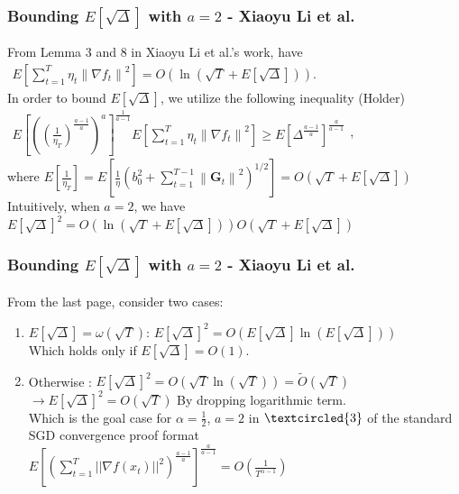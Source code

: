 \documentclass{beamer}
\begin{document}
\begin{frame}
\frametitle{Bounding $E\left[\sqrt{\Delta}\right]$ with $a = 2$ - Xiaoyu Li et al.}
    From Lemma 3 and 8 in Xiaoyu Li et al.'s work, have 
    $\begin{aligned} E\left[\sum_{t=1}^T \eta_t\left\|\nabla f_t\right\|^2\right] = O\left( \ln \left(\sqrt{T}+ E\left[\sqrt{\Delta}\right]\right)\right) .\end{aligned}$
    \\In order to bound $E\left[\sqrt{\Delta}\right]$,  we utilize the following inequality (Holder)
    $\begin{aligned} E\left[\left(\left(\frac{1}{\eta_T}\right)^{\frac{a-1}{a}}\right)^{a}\right]^{\frac{1}{a-1}}E\left[\sum_{t=1}^T \eta_t\left\|\nabla f_t\right\|^2\right] \geq E\left[\Delta^{\frac{a-1}{a}}\right]^{\frac{a}{a-1}}\end{aligned}$, \\where
    $E\left[\frac{1}{\eta_T}\right]=E\left[\frac{1}{\eta}\left(b_0^2+\sum_{t=1}^{T-1}\left\|\boldsymbol{G}_t \right\|^2\right)^{1 / 2}\right] = O\left(\sqrt{T}+ E\left[\sqrt{\Delta}\right]\right)$
    \\ Intuitively, when $a = 2$, we have \\ 
    $E\left[\sqrt{\Delta}\right]^{2} = O\left( \ln \left(\sqrt{T}+ E\left[\sqrt{\Delta}\right]\right)\right)O\left(\sqrt{T}+ E\left[\sqrt{\Delta}\right]\right)$
\end{frame}

\begin{frame}
\frametitle{Bounding $E\left[\sqrt{\Delta}\right]$ with $a = 2$ - Xiaoyu Li et al.}
    From the last page, consider two cases:
    \begin{enumerate}
        \item$E\left[\sqrt{\Delta}\right] = \omega \left(\sqrt{T}\right)$: 
        $E\left[\sqrt{\Delta}\right]^{2} = O\left(E\left[\sqrt{\Delta}\right]\ln\left(E\left[\sqrt{\Delta}\right]\right)\right)$ \\ 
        Which holds only if $E\left[\sqrt{\Delta}\right] = O\left(1\right)$.
        \item Otherwise : $E\left[\sqrt{\Delta}\right]^2 = O\left(\sqrt{T}\ln\left(\sqrt{T}\right)\right)=\tilde{O}\left(\sqrt{T}\right)$\\
        $\rightarrow  E\left[\sqrt{\Delta}\right]^2=O\left(\sqrt{T}\right)$ By
        dropping logarithmic term.
        \\Which is the goal case for $\alpha = \frac{1}{2}$, $a = 2$ in $\textcircled{3}$ of the standard SGD convergence proof format\\
        $E\left[(\sum_{t=1}^{T}||\nabla f(x_t)||^2)^\frac{a-1}{a}\right]^{\frac{a}{a-1}} = O(\frac{1}{T^{\alpha - 1}})$
        
    \end{enumerate}
\end{frame}
\end{document}
